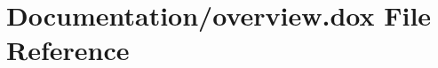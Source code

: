 \hypertarget{overview_8dox}{}\section{Documentation/overview.dox File Reference}
\label{overview_8dox}
